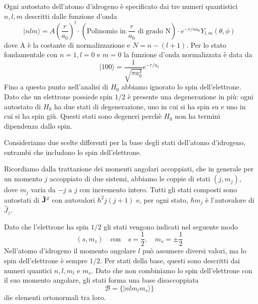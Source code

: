 Ogni autostato dell'atomo d'idrogeno \`e specificato dai tre numeri quantistici $n,l,m$ descritti dalle funzione d'onda
\begin{equation*}
	|nlm \rangle = A\left (\frac{r}{a_0}\right)^l \cdot \left ( \text{Polinomio in } \frac{r}{a_0}  \text{ di grado N}\right) \cdot e^{-r/na_0}Y_{l,m}(\theta ,\phi)
\end{equation*}
dove A \`e la costante di normalizzazione e $N = n - (l+1)$. Per lo stato fondamentale con $n=1,l=0$ e $m=0$ la funzione d'onda normalizzata \`e data da
\begin{equation*}
	|100 \rangle = \frac{1}{\sqrt{\pi a_0^3}}e^{-r/a_0}
\end{equation*}
Fino a questo punto nell'analisi di $H_0$ abbiamo ignorato lo spin dell'elettrone. Dato che un elettrone possiede spin $1/2$ \`e presente una degenerazione in pi\`u: ogni autostato di $H_0$ ha due stati di degenerazione, uno in cui si ha spin su e uno in cui si ha spin gi\`u. Questi stati sono degeneri perch\`e $H_0$ non ha termini dipendenza dallo spin.

Consideriamo due scelte differenti per la base degli stati dell'atomo d'idrogeno, entrambi che includono lo spin dell'elettrone.

Ricordiamo dalla trattazione dei momenti angolari accoppiati, che in generale per un momento $j$ accoppiato di due sistemi, abbiamo le coppie di stati $(j,m_j)$, dove $m_j$ varia da $-j$ a $j$ con incremento intero. Tutti gli stati composti sono autostati di $\bold{\hat{J}}^2$ con autovalori $\hbar^2j(j+1)$ e, per ogni stato, $\hbar m_j$ \`e l'autovalore di $\hat{J}_{z}$.

Dato che l'elettrone ha spin $1/2$ gli stati vengono indicati nel seguente modo
\begin{equation*}
	(s,m_s) \quad \text{con} \quad s=\frac{1}{2}, \quad m_{s} = \pm \frac{1}{2}
\end{equation*} 
Nell'atomo d'idrogeno il momento angolare $l$ pu\`o assumere diversi valori, ma lo spin dell'elettrone \`e sempre $1/2$. Per stati della base, questi sono descritti dai numeri quantici $n,l,m_l$ e $m_s$. Dato che non combiniamo lo spin dell'elettrone con il suo momento angolare, gli stati forma una base disaccoppiata
\begin{equation*}
	\mathcal{B} = \{|nlm_lm_s \rangle \} 
\end{equation*}
die elementi ortonormali tra loro.

